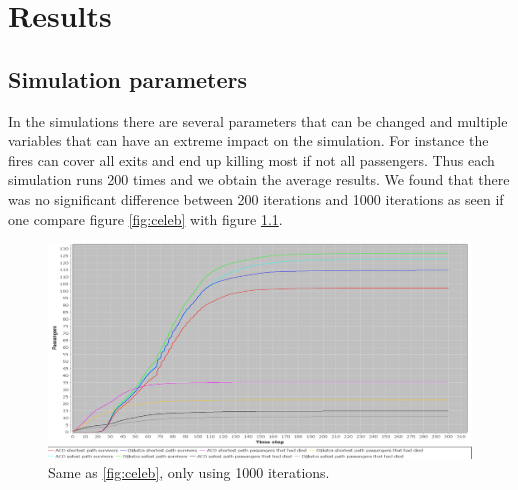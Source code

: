 \chapter{Results}
\label{ch:testing}


\section{Simulation parameters}

In the simulations there are several parameters that can be changed and multiple variables that can have an extreme impact on the simulation. For instance the fires can cover all exits and end up killing most if not all passengers. Thus each simulation runs 200 times and we obtain the average results. We found that there was no significant difference between 200 iterations and 1000 iterations as seen if one compare figure \ref{fig:celeb} with figure \ref{fig:celeb1000}.

\begin{figure} [float]
\centering
\hspace*{-1.0in}
\includegraphics[scale=0.35]{images/Graph-using-1000-rounds-140-passangers.png}
\caption{Same as \ref{fig:celeb}, only using 1000 iterations.}
\label{fig:celeb1000}
\end{figure}

